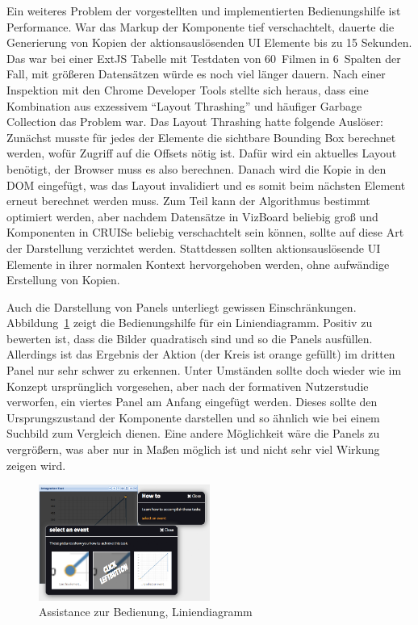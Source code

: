 \documentclass[
	headsepline,
	footsepline,
	fontsize=12pt,
	bibliography=totoc
]{scrbook}
\begin{document}

Ein weiteres Problem der vorgestellten und implementierten Bedienungshilfe ist Performance. War das Markup der Komponente tief verschachtelt, dauerte die Generierung von Kopien der aktionsauslösenden UI Elemente bis zu 15 Sekunden. Das war bei einer ExtJS Tabelle mit Testdaten von 60~Filmen in 6~Spalten der Fall, mit größeren Datensätzen würde es noch viel länger dauern. Nach einer Inspektion mit den Chrome Developer Tools stellte sich heraus, dass eine Kombination aus exzessivem \enquote{Layout Thrashing} und häufiger Garbage Collection das Problem war. Das Layout Thrashing hatte folgende Auslöser: Zunächst musste für jedes der  Elemente die sichtbare Bounding Box berechnet werden, wofür Zugriff auf die Offsets nötig ist. Dafür wird ein aktuelles Layout benötigt, der Browser muss es also berechnen. Danach wird die Kopie in den DOM eingefügt, was das Layout invalidiert und es somit beim nächsten Element erneut berechnet werden muss. Zum Teil kann der Algorithmus bestimmt optimiert werden, aber nachdem Datensätze in VizBoard beliebig groß und Komponenten in CRUISe beliebig verschachtelt sein können, sollte auf diese Art der Darstellung verzichtet werden. Stattdessen sollten aktionsauslösende UI Elemente in ihrer normalen Kontext hervorgehoben werden, ohne aufwändige Erstellung von Kopien.


Auch die Darstellung von Panels unterliegt gewissen Einschränkungen. Abbildung~\ref{figure:ui-howto-step2} zeigt die Bedienungshilfe für ein Liniendiagramm. Positiv zu bewerten ist, dass die Bilder quadratisch sind und so die Panels ausfüllen. Allerdings ist das Ergebnis der Aktion (der Kreis ist orange gefüllt) im dritten Panel nur sehr schwer zu erkennen. Unter Umständen sollte doch wieder wie im Konzept ursprünglich vorgesehen, aber nach der formativen Nutzerstudie verworfen, ein viertes Panel am Anfang eingefügt werden. Dieses sollte den Ursprungszustand der Komponente darstellen und so ähnlich wie bei einem Suchbild zum Vergleich dienen. Eine andere Möglichkeit wäre die Panels zu vergrößern, was aber nur in Maßen möglich ist und nicht sehr viel Wirkung zeigen wird.

\begin{figure}[htbp]
   \centering
   \includegraphics[width=0.5\textwidth]{images/implementierung-ui-howto-step2.png}
   \caption{Assistance zur Bedienung, Liniendiagramm}
   \label{figure:ui-howto-step2}
\end{figure}
\end{document}
